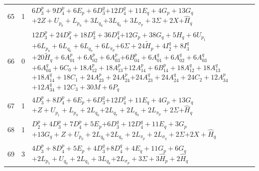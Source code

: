 \documentclass[11pt,a4paper]{article}
\theoremstyle{remark}
\begin{document}
\begin{longtable}{rrp{12.7cm}}
65&1&\( 6D_3^p + 9D_4^p + 6E_p + 6D_3^q \)\newline\( + 12D_4^q + 11E_q + 4G_p + 13G_q \)\newline\( + 2Z + U_{p_{0}} + L_{p_{9}} + 3L_{q_{6}} \)\newline\( + 3L_{q_{9}} + 3L_{\sigma_p} + 3\Sigma + 2X \)\newline\( + \widehat H_q \)\\[3pt]
66&0&\( 12D_3^p + 24D_4^p + 18D_3^q + 36D_4^q \)\newline\( + 12G_p + 38G_q + 5H_q + 6U_{p_{1}} \)\newline\( + 6L_{p_{8}} + 6L_{q_{6}} + 6L_{q_{7}} + 6L_{\pi_p} \)\newline\( + 6\Sigma + 24\widetilde H_p + 4I_2^q + 8I_3^q \)\newline\( + 20\widetilde H_q + 6A_{01}^p + 6A_{02}^p + 6A_{03}^p \)\newline\( + 6B_{04}^p + 6A_{01}^q + 6A_{02}^q + 6A_{03}^q \)\newline\( + 6A_{04}^q + 6C_0 + 18A_{12}^p + 18A_{13}^p \)\newline\( + 12A_{14}^p + 6B_{14}^p + 18A_{12}^q + 18A_{13}^q \)\newline\( + 18A_{14}^q + 18C_1 + 24A_{23}^p + 24A_{24}^p \)\newline\( + 24A_{23}^q + 24A_{24}^q + 24C_2 + 12A_{34}^p \)\newline\( + 12A_{34}^q + 12C_3 + 30M + 6P_q \)\\[3pt]
67&1&\( 4D_3^p + 8D_4^p + 6E_p + 6D_3^q \)\newline\( + 12D_4^q + 11E_q + 4G_p + 13G_q \)\newline\( + Z + U_{p_{1}} + L_{p_{9}} + 2L_{q_{6}} \)\newline\( + 2L_{q_{7}} + 2L_{q_{9}} + 2L_{\pi_p} + 2\Sigma \)\newline\( + \widehat H_q \)\\[3pt]
68&1&\( D_2^p + 4D_3^p + 7D_4^p + 5E_p \)\newline\( + 6D_3^q + 12D_4^q + 11E_q + 3G_p \)\newline\( + 13G_q + Z + U_{p_{0}} + 2L_{q_{6}} \)\newline\( + 2L_{q_{7}} + 2L_{\pi_p} + 2L_{\sigma_q} + 2\Sigma \)\newline\( + 2X + \widehat H_q \)\\[3pt]
69&3&\( 4D_3^p + 8D_4^p + 5E_p + 4D_3^q \)\newline\( + 8D_4^q + 4E_q + 11G_p + 6G_q \)\newline\( + 2L_{p_{5}} + U_{q_{0}} + 2L_{q_{5}} + 3L_{q_{8}} \)\newline\( + 2L_{\sigma_p} + 3\Sigma + 3\widehat H_p + 2\widehat H_q \)\\[3pt]

\end{longtable}
\end{document}
